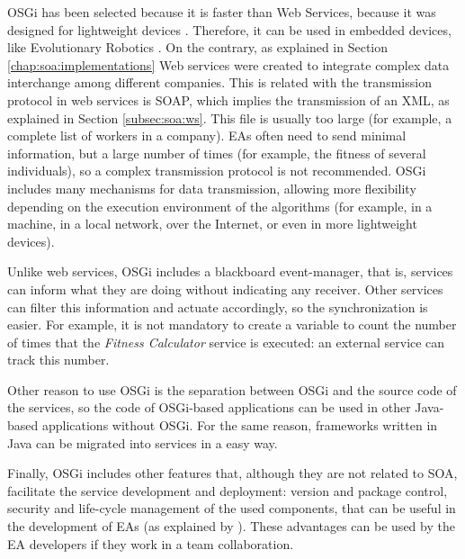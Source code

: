
OSGi has been selected because it is faster than Web Services, because it was designed for 
  lightweight devices \cite{LimGateway08}. Therefore, it can be
  used in embedded devices, like Evolutionary Robotics
  \cite{Garcia2012testing}. On the contrary, as explained in Section \ref{chap:soa:implementations} Web services were created to integrate complex
  data interchange among different companies. This is related with the transmission protocol in web services is SOAP, which implies
  the transmission of an XML, as explained in Section \ref{subsec:soa:ws}. This file is usually too large (for example, a
  complete list of workers in a company). EAs often need to send
  minimal information, but a large number of times (for example, the
  fitness of several individuals), so a complex transmission protocol
  is not recommended. OSGi includes many mechanisms for data
  transmission, allowing more flexibility depending on the execution environment of
  the algorithms (for example, in a machine, in a local
  network, over the Internet, or even in more lightweight devices). 

Unlike web services, OSGi includes a blackboard event-manager,
   that is, services can inform what they are doing without indicating 
 any receiver. Other services can filter this information and actuate
 accordingly, so the synchronization is easier. For example, it is not
 mandatory to create a variable to count the number of times that the
 {\em Fitness Calculator} service is executed: an external service can
 track this number. 

Other reason to use OSGi is the separation between OSGi and the source code of the
   services, so the code of OSGi-based applications can be used in other
   Java-based applications without OSGi. For the same reason,
   frameworks written in Java can be migrated into services in a easy
   way.

Finally, OSGi includes other features that, although they are not related to SOA, facilitate the service development and deployment: version and package
   control, security and life-cycle management of the used
   components, that can be useful in the development of EAs 
   (as explained by  \cite{WagnerPlugins07}). These advantages can be used by the EA developers if
   they work in a team collaboration. %

